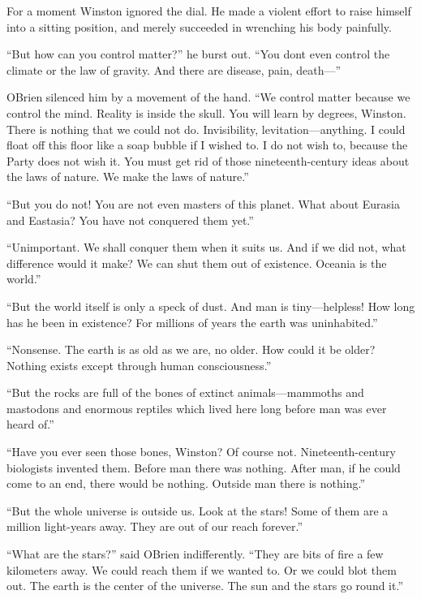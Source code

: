 For a moment Winston ignored the dial. He made a violent effort to raise
himself into a sitting position, and merely succeeded in wrenching his
body painfully.

``But how can you control matter?'' he burst out. ``You
don\textquotesingle t even control the climate or the law of gravity.
And there are disease, pain, death---''

O\textquotesingle Brien silenced him by a movement of the hand. ``We
control matter because we control the mind. Reality is inside the skull.
You will learn by degrees, Winston. There is nothing that we could not
do. Invisibility, levitation---anything. I could float off this floor
like a soap bubble if I wished to. I do not wish to, because the Party
does not wish it. You must get rid of those nineteenth-century ideas
about the laws of nature. We make the laws of nature.''

``But you do not! You are not even masters of this planet. What about
Eurasia and Eastasia? You have not conquered them yet.''

``Unimportant. We shall conquer them when it suits us. And if we did not,
what difference would it make? We can shut them out of existence.
Oceania is the world.''

``But the world itself is only a speck of dust. And man is
tiny---helpless! How long has he been in existence? For millions of
years the earth was uninhabited.''

``Nonsense. The earth is as old as we are, no older. How could it be
older? Nothing exists except through human consciousness.''

``But the rocks are full of the bones of extinct animals---mammoths and
mastodons and enormous reptiles which lived here long before man was
ever heard of.''

``Have you ever seen those bones, Winston? Of course not.
Nineteenth-century biologists invented them. Before man there was
nothing. After man, if he could come to an end, there would be nothing.
Outside man there is nothing.''

``But the whole universe is outside us. Look at the stars! Some of them
are a million light-years away. They are out of our reach forever.''

``What are the stars?'' said O\textquotesingle Brien indifferently. ``They
are bits of fire a few kilometers away. We could reach them if we wanted
to. Or we could blot them out. The earth is the center of the universe.
The sun and the stars go round it.''

